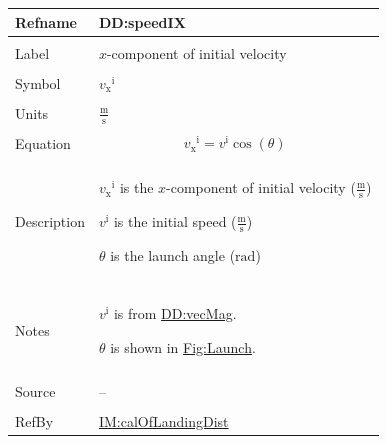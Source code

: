 \documentclass[12pt]{article}
\begin{document}
\vspace{\baselineskip}
\noindent
\begin{minipage}{\textwidth}
\begin{tabular}{>{\raggedright}p{}>{\raggedright\arraybackslash}p{}}
\toprule \textbf{Refname} & \textbf{DD:speedIX}
\label{DD:speedIX}
\\ \midrule \\
Label & $x$-component of initial velocity
        
\\ \midrule \\
Symbol & ${{v_{\text{x}}}^{\text{i}}}$
         
\\ \midrule \\
Units & $\frac{\text{m}}{\text{s}}$
        
\\ \midrule \\
Equation & \begin{displaymath}
           {{v_{\text{x}}}^{\text{i}}}={v^{\text{i}}} \cos\left(θ\right)
           \end{displaymath}
\\ \midrule \\
Description & \begin{symbDescription}
              \item{${{v_{\text{x}}}^{\text{i}}}$ is the $x$-component of initial velocity ($\frac{\text{m}}{\text{s}}$)}
              \item{${v^{\text{i}}}$ is the initial speed ($\frac{\text{m}}{\text{s}}$)}
              \item{$θ$ is the launch angle (${\text{rad}}$)}
              \end{symbDescription}
\\ \midrule \\
Notes & ${v^{\text{i}}}$ is from \hyperref[DD:vecMag]{DD:vecMag}.
        
        $θ$ is shown in \hyperref[Figure:Launch]{Fig:Launch}.
        
\\ \midrule \\
Source & --
         
\\ \midrule \\
RefBy & \hyperref[IM:calOfLandingDist]{IM:calOfLandingDist}
        
\\ \bottomrule
\end{tabular}
\end{minipage}
\end{document}
